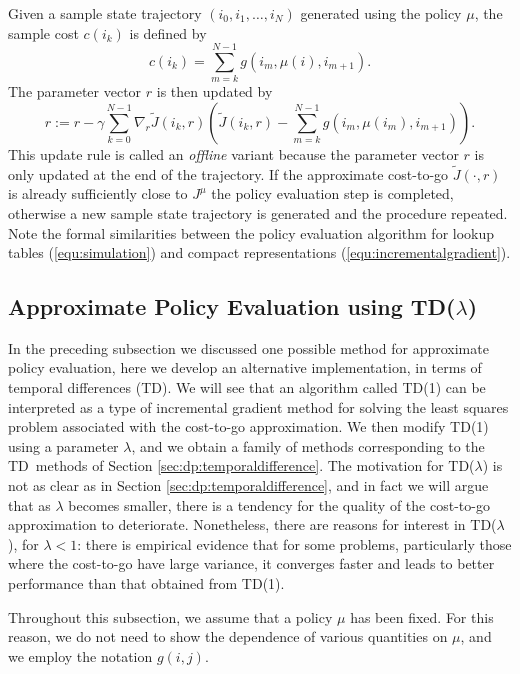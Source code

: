 Given a sample state trajectory $(i_0,i_1,\ldots,i_N)$ generated using the policy $\mu$, the sample cost $c(i_k)$ is defined by 
$$c(i_k) = \sum_{m=k}^{N-1} g(i_m,\mu(i),i_{m+1}).$$
The parameter vector $r$ is then updated by 
\begin{equation} \label{equ:incrementalgradient}
r:= r-\gamma \sum_{k=0}^{N-1} \nabla_r \tilde J(i_k,r) \left( \tilde J(i_k,r) - \sum_{m=k}^{N-1} g(i_m,\mu(i_m),i_{m+1}) \right).
\end{equation}
This update rule is called an \emph{offline} variant because the parameter vector $r$ is only updated at the end of the trajectory. If the approximate cost-to-go $\tilde J(\cdot,r)$ is already sufficiently close to $J^\mu$ the policy evaluation step is completed, otherwise a new sample state trajectory is generated and the procedure repeated. Note the formal similarities between the policy evaluation algorithm for lookup tables (\ref{equ:simulation}) and compact representations (\ref{equ:incrementalgradient}).






\subsection{Approximate Policy Evaluation using TD($\lambda$)} \label{sec:approx:eval:td}
In the preceding subsection we discussed one possible method for approximate policy evaluation, here we develop an alternative implementation, in terms of temporal differences (TD). We will see that an algorithm called TD(1) can be interpreted as a type of incremental gradient method for solving the least squares problem associated with the cost-to-go approximation. We then modify TD(1) using a parameter $\lambda$, and we obtain a family of methods corresponding to the TD~methods of Section \ref{sec:dp:temporaldifference}. The motivation for TD($\lambda$) is not as clear as in Section \ref{sec:dp:temporaldifference}, and in fact we will argue that as $\lambda$ becomes smaller, there is a tendency for the quality of the cost-to-go approximation to deteriorate. Nonetheless, there are reasons for interest in TD($\lambda$), for $\lambda < 1$: there is empirical evidence that for some problems, particularly those where the cost-to-go have large variance, it converges faster and leads to better performance than that obtained from TD(1).

Throughout this subsection, we assume that a policy $\mu$ has been fixed. For this reason, we do not need to show the dependence of various quantities on $\mu$, and we employ the notation $g(i,j)$.




